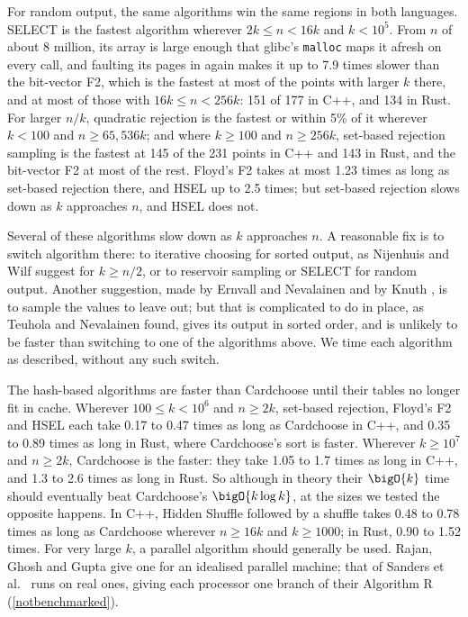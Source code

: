 \documentclass[letterpaper,11pt]{article}
\begin{document}
For random output, the same algorithms win the same regions in both
languages. SELECT is the fastest algorithm wherever \(2k \leq n < 16k\)
and \(k < 10^5\). From \(n\) of about 8 million, its array is large
enough that glibc's \texttt{malloc} maps it afresh on every
call, and faulting its pages in again makes it up to 7.9 times slower
than the bit-vector F2, which is the fastest at most of the points
with larger \(k\) there, and at most of those with
\(16k \leq n < 256k\): 151 of 177 in C++, and 134 in Rust. For larger
\(n/k\), quadratic rejection is the fastest or within 5\% of it
wherever \(k < 100\) and \(n \geq 65{,}536k\); and where
\(k \geq 100\) and \(n \geq 256k\), set-based rejection sampling is the
fastest at 145 of the 231 points in C++ and 143 in Rust, and the
bit-vector F2 at most of the rest. Floyd's F2 takes at most 1.23 times
as long as set-based rejection there, and HSEL up to 2.5 times; but
set-based rejection slows down as \(k\) approaches \(n\), and HSEL does
not.

Several of these algorithms slow down as \(k\) approaches \(n\). A
reasonable fix is to switch algorithm there: to iterative choosing for
sorted output, as Nijenhuis and Wilf
\cite[Chapter 4]{nijenhuiswilf} suggest for \(k \geq n/2\), or to
reservoir sampling or SELECT for random output. Another
suggestion, made by Ernvall and Nevalainen \cite{hsel} and by Knuth
\cite[\S 3.4.2, exercise 16]{taocp2}, is to
sample the values to leave out; but that is complicated to do in place,
as Teuhola and Nevalainen \cite{teuhola} found, gives its output in
sorted order, and is unlikely to be faster than switching to one of
the algorithms above. We time each algorithm as described, without any
such switch.

The hash-based algorithms are faster than Cardchoose until their tables
no longer fit in cache. Wherever \(100 \leq k < 10^6\) and
\(n \geq 2k\), set-based rejection, Floyd's F2 and HSEL each take 0.17
to 0.47 times as long as Cardchoose in C++, and 0.35 to 0.89 times as
long in Rust, where Cardchoose's sort is faster. Wherever
\(k \geq 10^7\) and \(n \geq 2k\), Cardchoose is the faster: they take
1.05 to 1.7 times as long in C++, and 1.3 to 2.6 times as long in Rust.
So although in theory their \(\bigO{k}\) time should eventually beat
Cardchoose's \(\bigO{k \log k}\), at the sizes we tested the opposite
happens. In C++, Hidden Shuffle followed by a shuffle takes 0.48 to
0.78 times as long as Cardchoose wherever \(n \geq 16k\) and
\(k \geq 1000\); in Rust, 0.90 to 1.52 times. For very large \(k\), a
parallel algorithm should generally be used. Rajan, Ghosh and Gupta
\cite{rajan} give one for an idealised parallel machine; that of
Sanders et al.\ \cite{sandersetal} runs on real ones, giving each
processor one branch of their Algorithm R (\autoref{notbenchmarked}).
\end{document}
